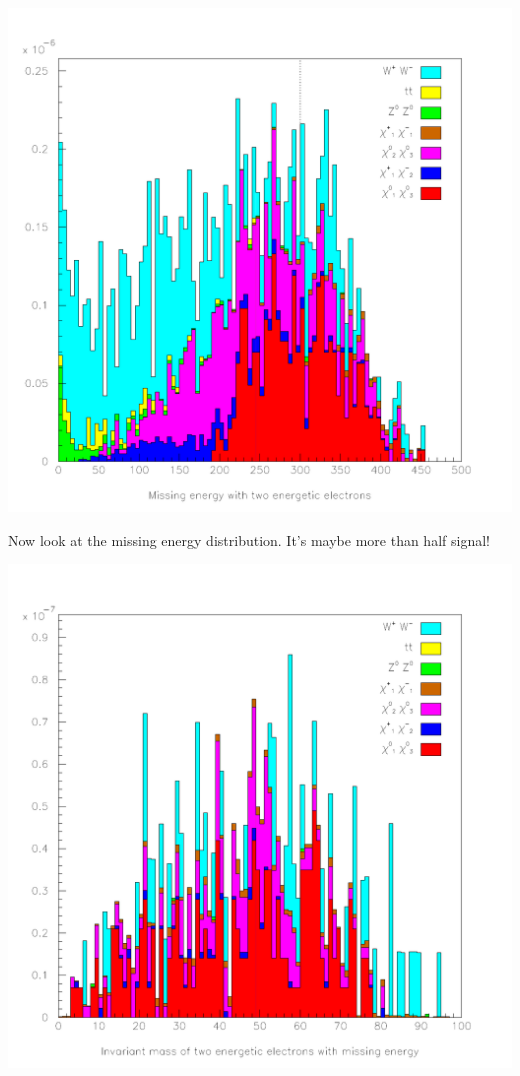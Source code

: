 \documentclass[landscape]{article}
\begin{document}
\begin{center} \includegraphics[height=0.8\textheight]{withmatching_5.pdf} \end{center}

Now look at the missing energy distribution.  It's maybe more than
half signal!

\pagebreak

\begin{center} \includegraphics[height=0.8\textheight]{withmatching_6.pdf} \end{center}
\end{document}
